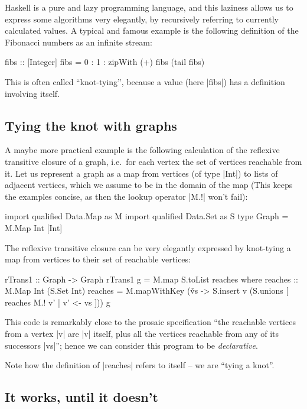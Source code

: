 \documentclass[manuscript,review,screen,acmsmall]{acmart}
\begin{document}
Haskell is a pure and lazy programming language, and this laziness allows us to express some algorithms very elegantly, by recursively referring to currently calculated values. A typical and famous example is the following definition of the Fibonacci numbers as an infinite stream:
\begin{code}
fibs :: [Integer]
fibs = 0 : 1 : zipWith (+) fibs (tail fibs)
\end{code}
This is often called “knot-tying”, because a value (here |fibs|) has a definition involving itself.

\subsection{Tying the knot with graphs}

A maybe more practical example is the following calculation of the reflexive transitive closure of a graph, i.e.\ for each vertex the set of vertices reachable from it. Let us represent a graph as a map from vertices (of type |Int|) to lists of adjacent vertices, which we assume to be in the domain of the map (This keeps the examples concise, as then the lookup operator |M.!| won't fail):
\begin{code}
import qualified Data.Map as M
import qualified Data.Set as S
type Graph = M.Map Int [Int]
\end{code}

The reflexive transitive closure can be very elegantly expressed by knot-tying a map from vertices to their set of reachable vertices:
\begin{code}
rTrans1 :: Graph -> Graph
rTrans1 g = M.map S.toList reaches
  where
    reaches :: M.Map Int (S.Set Int)
    reaches = M.mapWithKey (\v vs -> S.insert v (S.unions [ reaches M.! v' | v' <- vs ])) g
\end{code}
This code is remarkably close to the prosaic specification “the reachable vertices from a vertex |v| are |v| itself, plus all the vertices reachable from any of its successors |vs|”; hence we can consider this program to be \emph{declarative}.

Note how the definition of |reaches| refers to itself -- we are “tying a knot”.

\subsection{It works, until it doesn't}
\end{document}
